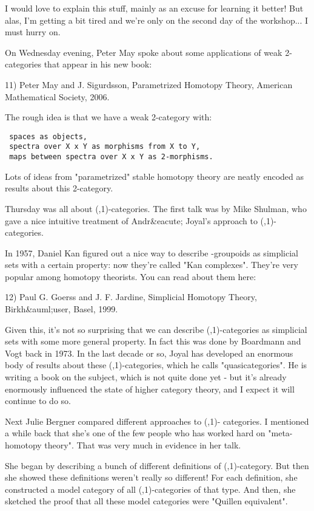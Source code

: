 I would love to explain this stuff, mainly as an excuse for 
learning it better!  But alas, I'm getting a bit tired and we're
only on the second day of the workshop... I must hurry on.

On Wednesday evening, Peter May spoke about some applications of
weak 2-categories that appear in his new book:

11) Peter May and J. Sigurdsson, Parametrized Homotopy Theory,
American Mathematical Society, 2006.

The rough idea is that we have a weak 2-category with:

\begin{verbatim}
 spaces as objects,
 spectra over X x Y as morphisms from X to Y,
 maps between spectra over X x Y as 2-morphisms.
\end{verbatim}
    

Lots of ideas from "parametrized" stable homotopy theory
are neatly encoded as results about this 2-category.

Thursday was all about (\infty ,1)-categories.  The first talk was by
Mike Shulman, who gave a nice intuitive treatment of Andr&eacute;
Joyal's approach to (\infty ,1)-categories.

In 1957, Daniel Kan figured out a nice way to describe
\infty -groupoids as simplicial sets with a certain property: now
they're called "Kan complexes".  They're very popular among
homotopy theorists.  You can read about them here:

12) Paul G. Goerss and J. F. Jardine, Simplicial Homotopy Theory, 
Birkh&auml;user, Basel, 1999.

Given this, it's not so surprising that we can describe
(\infty ,1)-categories as simplicial sets with some more general
property.  In fact this was done by Boardmann and Vogt back in 1973.
In the last decade or so, Joyal has developed an enormous body of
results about these (\infty ,1)-categories, which he calls
"quasicategories".  He is writing a book on the subject,
which is not quite done yet - but it's already enormously influenced
the state of higher category theory, and I expect it will continue to
do so.

Next Julie Bergner compared different approaches to (\infty ,1)-
categories.  I mentioned a while back that she's one of the few people
who has worked hard on "meta-homotopy theory".  That was
very much in evidence in her talk.

She began by describing a bunch of different definitions of 
(\infty ,1)-category.  But then she showed these definitions
weren't really so different!  For each definition, she constructed 
a model category of all (\infty ,1)-categories of that type.   
And then, she sketched the proof that all these model categories 
were "Quillen equivalent".  

